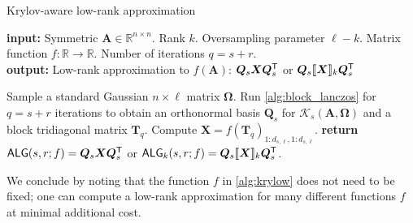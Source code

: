 \begin{algorithm}
\caption{Krylov-aware low-rank approximation}
\label{alg:krylow}
\textbf{input:} Symmetric $\bm{A} \in \mathbb{R}^{n \times n}$. Rank $k$. Oversampling parameter $\ell -k$. Matrix function $f: \mathbb{R} \to \mathbb{R}$. Number of iterations $q = s + r$.\\
\textbf{output:} Low-rank approximation to $f(\bm{A})$: $\bm{Q}_s \bm{X} \bm{Q}_s^{\textsf{\textup{T}}}$ or $\bm{Q}_s \llbracket \bm{X} \rrbracket_k  \bm{Q}_s^{\textsf{\textup{T}}}$%
\begin{algorithmic}[1]
    \State Sample a standard Gaussian $n \times \ell $ matrix $\bm{\Omega}$.
    \State Run \cref{alg:block_lanczos} for $q=s+r$ iterations to obtain an orthonormal basis $\bm{Q}_s$ for $\mathcal{K}_{s}(\bm{A},\bm{\Omega})$ and a block tridiagonal matrix $\bm{T}_q$.
    \State Compute $\bm{X} = f(\bm{T}_q)_{1:d_{s,\ell},1:d_{s,\ell}}$.  
    \State \textbf{return} $\textsf{\textup{ALG}}(s,r;f) = \bm{Q}_s \bm{X}\bm{Q}_s^{\textsf{\textup{T}}}$ or $\textsf{\textup{ALG}}_k(s,r;f) = \bm{Q}_s \llbracket \bm{X} \rrbracket_k  \bm{Q}_s^{\textsf{\textup{T}}}$.
\end{algorithmic}
\end{algorithm}
We conclude by noting that the function $f$ in \cref{alg:krylow} does not need to be fixed; one can compute a low-rank approximation for many different functions $f$ at minimal additional cost. 